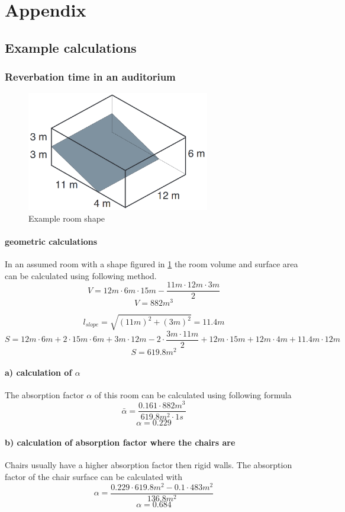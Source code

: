 \documentclass{article}
\begin{document}
\section{Appendix}
\subsection{Example calculations}
\subsubsection{Reverbation time in an auditorium}
\begin{figure}[htbp]
\begin{center}
\includegraphics[width=8cm,keepaspectratio=true]{testroom}
\caption{Example room shape}
\label{fig:testroom}
\end{center}
\end{figure}
\paragraph{geometric calculations\\}
In an assumed room with a shape figured in \ref{fig:testroom} the room volume and surface area can be calculated using following method.
$$V=12m\cdot 6m\cdot 15m - \frac{11m\cdot 12m\cdot 3m}{2}$$
$$V=882m^3$$

$$l_{slope}=\sqrt{(11m)^2+(3m)^2}=11.4m$$
$$S=12m\cdot 6m+2\cdot 15m\cdot 6m+3m\cdot 12m-2\cdot\frac{3m\cdot 11m}{2}+12m\cdot 15m+12m\cdot 4m+11.4m\cdot 12m$$
$$S=619.8m^2$$

\paragraph{a) calculation of $\alpha$\\}
The absorption factor $\alpha$ of this room can be calculated using following formula
$$\bar{\alpha}=\frac{0.161\cdot 882m^3}{619.8m^2\cdot 1s}$$
$$\alpha=0.229$$

\paragraph{b) calculation of absorption factor where the chairs are\\}
Chairs usually have a higher absorption factor then rigid walls. The absorption factor of the chair surface can be calculated with
$$\alpha=\frac{0.229\cdot 619.8m^2-0.1\cdot 483m^2}{136.8m^2}$$
$$\alpha=0.684$$
\end{document}
